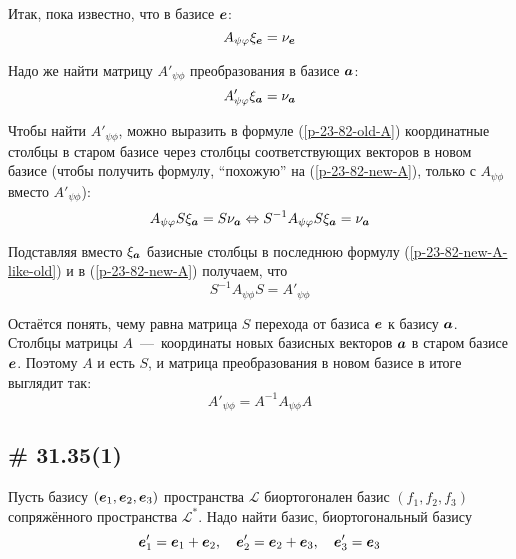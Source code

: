 \documentclass[a4paper,12pt]{article}
\begin{document}
\begin{solution}
    Итак, пока известно, что в базисе $\boldsymbol e$:
    \begin{equation}\label{p-23-82-old-A}
      A_{\psi \varphi} \xi_{\boldsymbol e} = \nu_{\boldsymbol e}
    \end{equation}
    
    Надо же найти матрицу $A'_{\psi\phi}$ преобразования в базисе $\boldsymbol a$:
    \begin{equation}\label{p-23-82-new-A}
      A'_{\psi\varphi} \xi_{\boldsymbol a} = \nu_{\boldsymbol a}
    \end{equation}
    
    Чтобы найти $A'_{\psi\phi}$, можно выразить в формуле (\ref{p-23-82-old-A}) координатные столбцы в старом базисе через столбцы соответствующих векторов в новом базисе (чтобы получить формулу, ``похожую'' на (\ref{p-23-82-new-A}), только с $A_{\psi\phi}$ вместо $A'_{\psi\phi}$):
    \begin{equation}\label{p-23-82-new-A-like-old}
      A_{\psi\varphi} S \xi_{\boldsymbol a} = S \nu_{\boldsymbol a}
      \Leftrightarrow S^{-1} A_{\psi\varphi} S \xi_{\boldsymbol a} = \nu_{\boldsymbol a}
    \end{equation}
    
    Подставляя вместо $\xi_{\boldsymbol a}$ базисные столбцы в последнюю формулу (\ref{p-23-82-new-A-like-old}) и в (\ref{p-23-82-new-A}) получаем, что
    \[
      S^{-1} A_{\psi\phi} S = A'_{\psi\phi}
    \]
    
    Остаётся понять, чему равна матрица $S$ перехода от базиса $\boldsymbol e$ к базису $\boldsymbol a$.
    Столбцы матрицы $A$~---~координаты новых базисных векторов $\boldsymbol a$ в старом базисе $\boldsymbol e$.
    Поэтому $A$ и есть $S$, и матрица преобразования в новом базисе в итоге выглядит так:
    \[
      A'_{\psi\phi} = A^{-1} A_{\psi\phi} A
    \]
  \end{solution}
  
  
  \subsection{\# 31.35(1)}
  
  Пусть базису $(\boldsymbol e_1, \boldsymbol e_2, \boldsymbol e_3)$ пространства $\mathcal L$ биортогонален базис $(f_1, f_2, f_3)$ сопряжённого пространства $\mathcal L^*$.
  Надо найти базис, биортогональный базису
  \[
    \boldsymbol e_1' = \boldsymbol e_1 + \boldsymbol e_2,
    \quad \boldsymbol e_2' = \boldsymbol e_2 + \boldsymbol e_3,
    \quad \boldsymbol e_3' = \boldsymbol e_3
  \]
  
\end{document}
